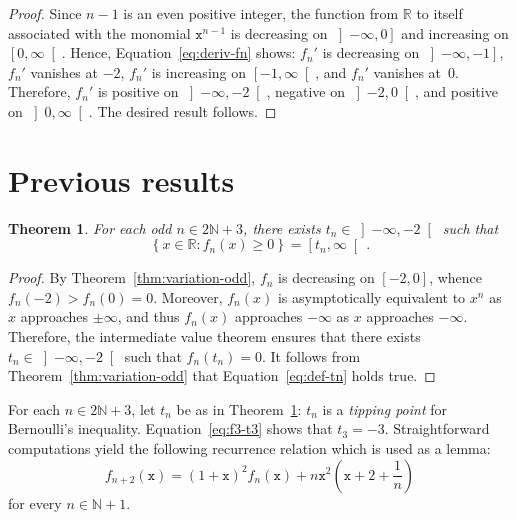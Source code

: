 \documentclass[12pt]{article}
\newcommand{\bR}{\mathbb{R}}
\newcommand{\bN}{\mathbb{N}}
\newcommand{\gtint}[1]{\left] #1, \infty \right[}
\newcommand{\geint}[1]{\left[ #1, \infty \right[}
\newcommand{\ltint}[1]{\left]- \infty, #1 \right[}
\newcommand{\leint}[1]{\left]- \infty, #1 \right]}
\newcommand{\ttx}{\mathtt{x}}
\newtheorem{theorem}{Theorem}
\begin{document}
 \begin{proof}
   Since $n - 1$ is an even positive integer,
   the function from $\bR$ to itself associated with the monomial $\ttx^{n - 1}$ is
   decreasing on $\leint{0}$ and
   increasing on $\geint{0}$.
   Hence, 
   Equation~\eqref{eq:deriv-fn} shows: 
   $f_n'$ is decreasing on $\leint{- 1}$,
   $f_n'$ vanishes at $- 2$,
   $f_n'$ is increasing on $\geint{- 1}$, and
   $f_n'$ vanishes at~$0$.
   Therefore, $f_n'$ is positive on $\ltint{- 2}$,
   negative on $\left]- 2, 0 \right[$, and
   positive on $\gtint{0}$.
   The desired result follows.
 \end{proof}
 
 

 \section{Previous results} 
 
 \begin{theorem} \label{thm:tipping-point}
   For each odd  $n \in 2 \bN + 3$,
   there exists $t_n \in \ltint{- 2}$ such that
 \begin{equation} \label{eq:def-tn}
 \left\{ x \in \bR : f_n(x) \ge 0 \right\}
 =
 \geint{t_n} \,. 
 \end{equation} 
 \end{theorem} 

 \begin{proof}
   By Theorem~\ref{thm:variation-odd},  $f_n$ is decreasing on $[- 2, 0]$,
   whence   $f_n(- 2) > f_n(0) = 0$.
   Moreover, $f_n(x)$ is asymptotically equivalent to $x^n$ as $x$ approaches $\pm \infty$,
   and thus $f_n(x)$ approaches $- \infty$ as $x$ approaches $- \infty$.
   Therefore, the intermediate value theorem ensures that there exists $t_n \in \ltint{- 2}$ such that $f_n(t_n) = 0$.
   It follows from Theorem~\ref{thm:variation-odd} that Equation~\eqref{eq:def-tn} holds true.
 \end{proof}

 For each $n \in 2 \bN + 3$,
 let $t_n$ be as in Theorem~\ref{thm:tipping-point}:
 $t_n$ is a \emph{tipping point} for Bernoulli's inequality.
 Equation~\eqref{eq:f3-t3} shows that $t_3 = - 3$. 
 Straightforward computations yield the following recurrence relation which is used as a lemma:
 \begin{equation} \label{eq:fn+2-fn}
   f_{n + 2} (\ttx) = {(1 + \ttx)}^2 f_n(\ttx) + n \ttx^2 \left(\ttx + 2 + \frac{1}{n} \right)
 \end{equation}
 for every $n \in \bN + 1$.
 
\end{document}
